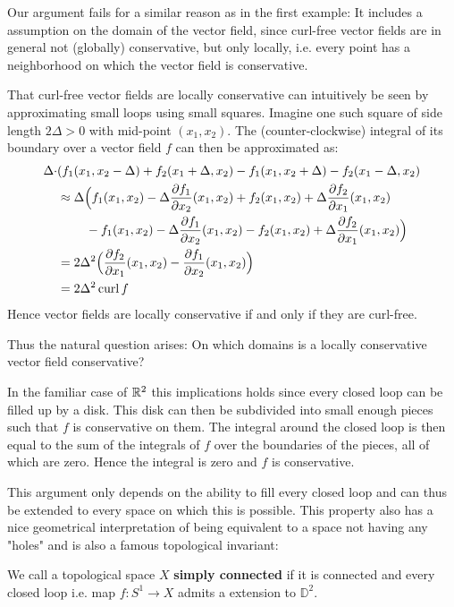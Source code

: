 Our argument fails for a similar reason as in the first example: It includes a assumption on the domain of
the vector field, since curl-free vector fields are in general not (globally) conservative, but only
locally, i.e. every point has a neighborhood on which the vector field is conservative.

That curl-free vector fields are locally conservative can intuitively be seen by approximating small
loops using small squares. Imagine one such square of side length $2\Delta > 0$ with mid-point
$(x_1, x_2)$. The (counter-clockwise) integral of its boundary over a vector field $f$ can then be
approximated as:
\begin{align*}
	\Delta \cdot & (  f_1(x_1, x_2 - \Delta) + f_2(x_1 + \Delta, x_2) - f_1(x_1, x_2 + \Delta) - f_2(x_1 - \Delta, x_2) \\
	&\approx \Delta \Big( f_1(x_1, x_2) - \Delta \frac{\partial f_1}{\partial x_2}(x_1, x_2) + f_2(x_1, x_2) + \Delta \frac{\partial f_2}{\partial x_1}(x_1, x_2) \\
	       & \phantom{\approx \Delta (}		   - f_1(x_1, x_2) - \Delta \frac{\partial f_1}{\partial x_2} (x_1, x_2) - f_2(x_1, x_2) + \Delta \frac{\partial f_2}{\partial x_1}(x_1, x_2) \Big) \\
	      &= 2\Delta^2 \Big( \frac{\partial f_2}{\partial x_1}(x_1, x_2) - \frac{\partial f_1}{\partial x_2}(x_1, x_2)\Big) \\
	&= 2 \Delta^2 \operatorname{curl} f
\end{align*}
Hence vector fields are locally conservative if and only if they are curl-free.

Thus the natural question arises: On which domains is a locally conservative vector field conservative? 

In the familiar case of $\mathbb{R}^2$ this implications holds since every closed loop can be filled up
by a disk. This disk can then be subdivided into small enough pieces such that $f$ is conservative on them. The integral around
the closed loop is then equal to the sum of the integrals of $f$ over the boundaries of the pieces, all
of which are zero. Hence the integral is zero and $f$ is conservative.

This argument only depends on the ability to fill every closed loop and can thus be extended to every space on which this is
possible. This property also has a nice geometrical interpretation of being equivalent to a space not having any "holes" and
is also a famous topological invariant:
\begin{definition}
We call a topological space $X$ \textbf{simply connected} if it is connected and every closed loop i.e. map $f: S^1 \to X$ admits a extension to $\mathbb{D}^2$.
\end{definition}

